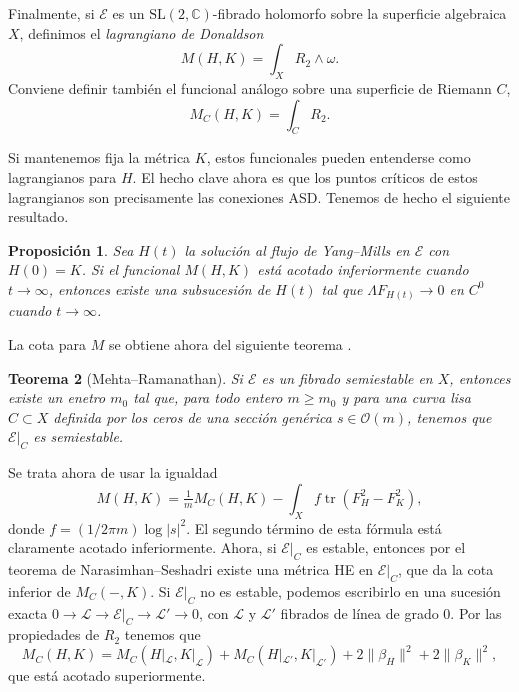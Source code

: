\documentclass[12pt, a4paper]{amsart}
\newcommand\CC{\mathbb{C}}
\newcommand\SL{\mathrm{SL}}
\newcommand\EE{\mathscr{E}}
\newcommand\LL{\mathscr{L}}
\newcommand\OO{\mathscr{O}}
\DeclareMathOperator\tr{tr}
\newtheorem{thm}{Teorema}[section]
\newtheorem{prop}[thm]{Proposición}
\theoremstyle{remark} \newtheorem{rmk}[thm]{Observación}
\theoremstyle{remark} \newtheorem{rmks}[thm]{Observaciones}
\theoremstyle{definition} \newtheorem{defn}[thm]{Definición}
\theoremstyle{definition} \newtheorem{ejs}[thm]{Ejemplos}
\theoremstyle{definition} \newtheorem{ej}[thm]{Ejemplo}
\begin{document}
Finalmente, si $\EE$ es un $\SL(2,\CC)$-fibrado holomorfo sobre la superficie algebraica $X$, definimos el \emph{lagrangiano de Donaldson}
\begin{equation*}
	M(H,K)=\int_X R_2 \wedge \omega.
\end{equation*} 
Conviene definir también el funcional análogo sobre una superficie de Riemann $C$,
\begin{equation*}
	M_C(H,K)=\int_C R_2.
\end{equation*} 

Si mantenemos fija la métrica $K$, estos funcionales pueden entenderse como lagrangianos para $H$. El hecho clave ahora es que los puntos críticos de estos lagrangianos son precisamente las conexiones ASD. Tenemos de hecho el siguiente resultado.

\begin{prop} Sea $H(t)$ la solución al flujo de Yang--Mills en $\EE$ con $H(0)=K$. Si el funcional $M(H,K)$ está acotado inferiormente cuando $t\rightarrow \infty$, entonces existe una subsucesión de $H(t)$ tal que $\Lambda F_{H(t)} \rightarrow 0$ en $C^0$ cuando $t\rightarrow \infty$.
\end{prop}

La cota para $M$ se obtiene ahora del siguiente teorema \cite{MR}. 

\begin{thm}[Mehta--Ramanathan] \label{MehtaRamanathan}
	Si $\EE$ es un fibrado semiestable en $X$, entonces existe un enetro $m_0$ tal que, para todo entero $m\geq m_0$ y para una curva lisa  $C\subset X$ definida por los ceros de una sección genérica $s\in \OO(m)$, tenemos que $\EE|_C$ es semiestable.
\end{thm}

Se trata ahora de usar la igualdad
 \begin{equation*}
	 M(H,K)=\tfrac{1}{m} M_C(H,K) - \int_X f \tr(F_H^2 - F_K^2),
\end{equation*} 
donde $f=(1/2\pi m)\log |s|^2$. El segundo término de esta fórmula está claramente acotado inferiormente. Ahora, si $\EE|_C$ es estable, entonces por el teorema de Narasimhan--Seshadri existe una métrica HE en  $\EE|_C$, que da la cota inferior de $M_C(-,K)$. Si $\EE|_C$ no es estable, podemos escribirlo en una sucesión exacta  $0\rightarrow \LL \rightarrow \EE|_C \rightarrow \LL' \rightarrow 0$, con  $\LL$ y $\LL'$ fibrados de línea de grado $0$. Por las propiedades de $R_2$ tenemos que
\begin{equation*}
	M_C(H,K)=M_C(H|_\LL,K|_\LL) + M_C(H|_{\LL'},K|_{\LL'}) + 2 \lVert \beta_H \rVert^2+ 2 \lVert \beta_K \rVert^2,
\end{equation*} 
que está acotado superiormente.
\end{document}
